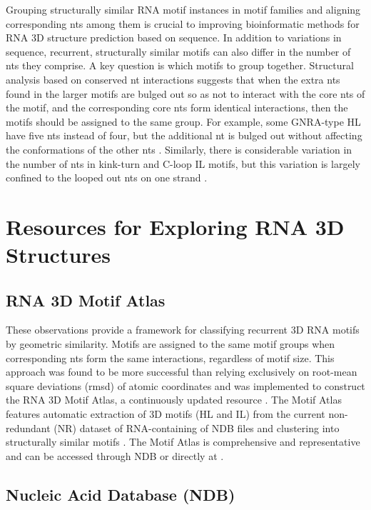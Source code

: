 Grouping structurally similar RNA motif instances in motif families and aligning
corresponding nts among them is crucial to improving bioinformatic methods for
RNA 3D structure prediction based on sequence. In addition to variations in
sequence, recurrent, structurally similar motifs can also differ in the number
of nts they comprise. A key question is which motifs to group together.
Structural analysis based on conserved nt interactions suggests that when the
extra nts found in the larger motifs are bulged out so as not to interact with
the core nts of the motif, and the corresponding core nts form identical
interactions, then the motifs should be assigned to the same group. For example,
some GNRA-type HL have five nts instead of four, but the additional nt is bulged
out without affecting the conformations of the other nts \cite{Nasalean2009b}.
Similarly, there is considerable variation in the number of nts in kink-turn and
C-loop IL motifs, but this variation is largely confined to the looped out nts
on one strand \cite{Lescoute2005}.

\section{Resources for Exploring RNA 3D Structures}

\subsection{RNA 3D Motif Atlas}

These observations provide a framework for classifying recurrent 3D RNA motifs
by geometric similarity. Motifs are assigned to the same motif groups when
corresponding nts form the same interactions, regardless of motif size. This
approach was found to be more successful than relying exclusively on root-mean
square deviations (rmsd) of atomic coordinates and was implemented to construct
the RNA 3D Motif Atlas, a continuously updated resource \cite{Petrov2013}. The
Motif Atlas features automatic extraction of 3D motifs (HL and IL) from the
current non-redundant (NR) dataset of RNA-containing of NDB files and clustering
into structurally similar motifs \cite{Petrov2013}. The Motif Atlas is
comprehensive and representative and can be accessed through NDB or directly at
.

\subsection{Nucleic Acid Database (NDB)}

